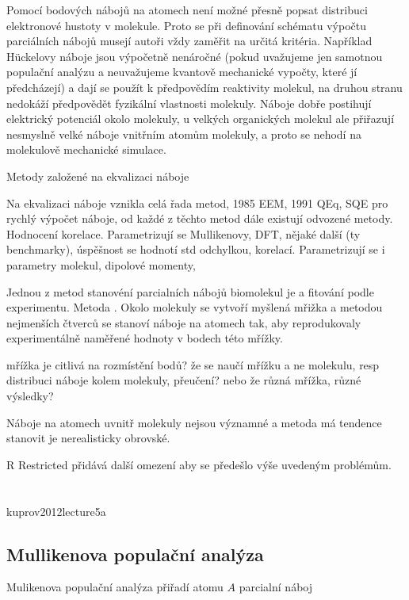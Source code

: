\documentclass[
  color, %
  table, %
  lof,   %
  lot,   %
]{fithesis3}
\begin{document}
Pomocí bodových nábojů na atomech není možné přesně popsat distribuci elektronové hustoty v molekule. Proto se při definování schématu výpočtu parciálních nábojů musejí autoři vždy zaměřit na určitá kritéria. Například Hückelovy náboje jsou výpočetně nenáročné (pokud uvažujeme jen samotnou populační analýzu a neuvažujeme kvantově mechanické vypočty, které jí předcházejí) a dají se použít k předpovědím reaktivity molekul, na druhou stranu nedokáží předpovědět fyzikální vlastnosti molekuly. Náboje dobře postihují elektrický potenciál okolo molekuly, u velkých organických molekul ale přiřazují nesmyslně velké náboje vnitřním atomům molekuly, a proto se nehodí na molekulově mechanické simulace.

Metody založené na ekvalizaci náboje  

Na ekvalizaci náboje vznikla celá řada metod, 1985 EEM, 1991 QEq, SQE pro rychlý výpočet náboje, od každé z těchto metod dále existují odvozené metody. Hodnocení korelace. Parametrizují se Mullikenovy, DFT, nějaké další (ty benchmarky), úspěšnost se hodnotí std odchylkou, korelací. Parametrizují se i parametry molekul, dipolové momenty, 

Jednou z metod stanovéní parcialních nábojů biomolekul je a fitování podle experimentu. Metoda . Okolo molekuly se vytvoří myšlená mřižka a metodou nejmenších čtverců se stanoví náboje na atomech tak, aby reprodukovaly experimentálně naměřené hodnoty v bodech této mřížky.

mřížka je citlivá na rozmístění bodů? že se naučí mřížku a ne molekulu, resp distribuci náboje kolem molekuly, přeučení? nebo že různá mřížka, různé výsledky?

Náboje na atomech uvnitř molekuly nejsou významné a metoda má tendence stanovit je nerealisticky obrovské.

R  Restricted přidává další omezení aby se předešlo výše uvedeným problémům.

\section{}

kuprov2012lecture5a

\subsection{Mullikenova populační analýza}

Mulikenova populační analýza přiřadí atomu $A$ parcialní náboj
\end{document}
